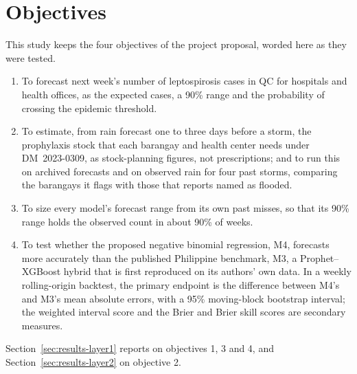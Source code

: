 \section{Objectives}\label{sec:objectives}

This study keeps the four objectives of the project proposal, worded here as they were tested.
\begin{enumerate}
  \item To forecast next week's number of leptospirosis cases in QC for hospitals and health
    offices, as the expected cases, a 90\% range and the probability of crossing the epidemic
    threshold.
  \item To estimate, from rain forecast one to three days before a storm, the prophylaxis stock
    that each barangay and health center needs under DM~\mbox{2023-0309}, as stock-planning
    figures, not prescriptions; and to run this on archived forecasts and on observed rain for
    four past storms, comparing the barangays it flags with those that reports named as flooded.
  \item To size every model's forecast range from its own past misses, so that its 90\% range
    holds the observed count in about 90\% of weeks.
  \item To test whether the proposed negative binomial regression, M4, forecasts more accurately
    than the published Philippine benchmark, M3, a Prophet--XGBoost hybrid
    \parencite{latigay2026} that is first reproduced on its authors' own data. In a weekly
    rolling-origin backtest, the primary endpoint is the difference between M4's and M3's mean
    absolute errors, with a 95\% moving-block bootstrap interval; the weighted interval score and
    the Brier and Brier skill scores are secondary measures.
\end{enumerate}
Section~\ref{sec:results-layer1} reports on objectives 1, 3 and 4, and
Section~\ref{sec:results-layer2} on objective 2.
